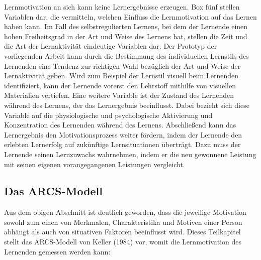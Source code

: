     Lernmotivation an sich kann keine Lernergebnisse erzeugen. Box fünf stellen Variablen dar, die vermitteln, welchen Einfluss die Lernmotivation auf das Lernen haben kann.
    Im Fall des selbstregulierten Lernens, bei dem der Lernende einen hohen Freiheitsgrad
    in der Art und Weise des Lernens hat, stellen die Zeit und die Art der Lernaktivität eindeutige Variablen dar. \parencite[84]{rheinberg.2000} 
    Der Prototyp der vorliegenden Arbeit kann durch die Bestimmung des individuellen Lernstils des Lernenden 
    eine Tendenz zur richtigen Wahl bezüglich der Art und Weise der Lernaktivität geben. Wird zum Beispiel 
    der Lernstil visuell beim Lernenden identifiziert, kann der Lernende vorerst den Lehrstoff mithilfe
    von visuellen Materialien vertiefen.
    Eine weitere Variable ist der Zustand des Lernenden während des Lernens, der das Lernergebnis beeinflusst.
    Dabei bezieht sich diese Variable auf die physiologische und psychologische Aktivierung und Konzentration des Lernenden während des Lernens. \parencite[84]{rheinberg.2000} 
    Abschließend kann das Lernergebnis den Motivationsprozess weiter fördern, indem der Lernende den erlebten Lernerfolg auf zukünftige Lernsituationen überträgt. Dazu muss der Lernende seinen Lernzuwachs wahrnehmen, indem 
    er die neu gewonnene Leistung mit seinen eigenen vorangegangenen Leistungen vergleicht. \parencite[21]{marx.2006} 

        \subsection{Das ARCS-Modell} \label{Kap2ARCS}
        Aus dem obigen Abschnitt ist deutlich geworden, dass die jeweilige Motivation sowohl zum einen von Merkmalen, Charakteristika und Motiven einer Person abhängt als auch von situativen Faktoren
        beeinflusst wird. 
        Dieses Teilkapitel stellt das ARCS-Modell von Keller (1984) vor, womit die Lernmotivation des Lernenden gemessen werden kann:
        

